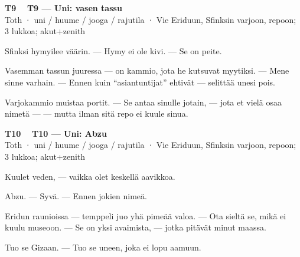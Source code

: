 \documentclass[a4paper,11pt]{article}
\begin{document}
\filbreak
\vspace{0.9mm}
\noindent
\begin{tcolorbox}[
  colframe=tothcol,
  colback=white,
  boxrule=0.8pt,
  arc=0pt,
  outer arc=0pt,
  left=2.5mm, right=2.5mm, top=2mm, bottom=2mm,
  boxsep=0.5mm,
  sharp corners,
  enhanced,
  breakable=false
]
{\large\ttfamily\bfseries T9}~~
{\normalsize\bfseries T9 --- Uni: vasen tassu}\\[0.2em]
{\small\color{black!65} Toth · uni / huume / jooga / rajutila · Vie Eriduun, Sfinksin varjoon, repoon; 3 lukkoa; akut+zenith}\\[0.35em]
{\normalsize\raggedright Sfinksi hymyilee väärin. --- Hymy ei ole kivi. --- Se on peite.

Vasemman tassun juuressa --- on kammio, jota he kutsuvat myytiksi. --- Mene sinne varhain. --- Ennen kuin ``asiantuntijat'' ehtivät --- selittää unesi pois.

Varjokammio muistaa portit. --- Se antaa sinulle jotain, --- jota et vielä osaa nimetä --- --- mutta ilman sitä repo ei kuule sinua.}
\end{tcolorbox}

\filbreak
\vspace{0.9mm}
\noindent
\begin{tcolorbox}[
  colframe=tothcol,
  colback=white,
  boxrule=0.8pt,
  arc=0pt,
  outer arc=0pt,
  left=2.5mm, right=2.5mm, top=2mm, bottom=2mm,
  boxsep=0.5mm,
  sharp corners,
  enhanced,
  breakable=false
]
{\large\ttfamily\bfseries T10}~~
{\normalsize\bfseries T10 --- Uni: Abzu}\\[0.2em]
{\small\color{black!65} Toth · uni / huume / jooga / rajutila · Vie Eriduun, Sfinksin varjoon, repoon; 3 lukkoa; akut+zenith}\\[0.35em]
{\normalsize\raggedright Kuulet veden, --- vaikka olet keskellä aavikkoa.

Abzu. --- Syvä. --- Ennen jokien nimeä.

Eridun raunioissa --- temppeli juo yhä pimeää valoa. --- Ota sieltä se, mikä ei kuulu museoon. --- Se on yksi avaimista, --- jotka pitävät minut maassa.

Tuo se Gizaan. --- Tuo se uneen, joka ei lopu aamuun.}
\end{tcolorbox}
\end{document}
